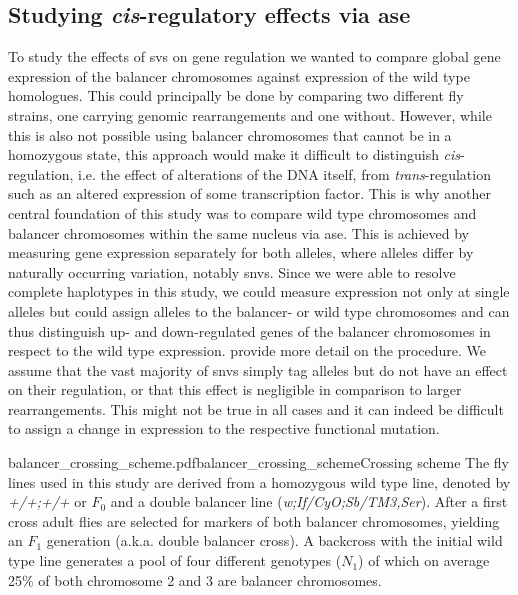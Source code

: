 \subsection{Studying \texorpdfstring{\textit{cis}}{cis}-regulatory effects via
    \texorpdfstring{\acl{ase}}{allele-specific expression}}
\label{sec:balancer_ase_motivation}

To study the effects of \acp{sv} on gene regulation we wanted to compare global
gene expression of the balancer chromosomes against expression of the wild type
homologues. This could principally be done by comparing two different fly
strains, one carrying genomic rearrangements and one without. However, while
this is also not possible using balancer chromosomes that cannot be
in a homozygous state, this approach would make it difficult to distinguish
\textit{cis}-regulation, i.e. the effect of alterations of the DNA itself, from
\textit{trans}-regulation such as an altered expression of some transcription
factor. This is why another central foundation of this study was to compare wild
type chromosomes and balancer chromosomes within the same nucleus via \acf{ase}.
This is achieved by measuring gene expression separately for both alleles, where
alleles differ by naturally occurring variation, notably \acp{snv}.
Since we were able to resolve complete haplotypes in this study, we could
measure expression not only at single alleles but could assign alleles to
the balancer- or wild type chromosomes and can thus distinguish up- and
down-regulated genes of the balancer chromosomes in respect to the wild type
expression.  provide
more detail on the procedure.
We assume that the vast majority of \acp{snv} simply tag alleles but do not have
an effect on their regulation, or that this effect is negligible in comparison
to larger rearrangements. This might not be true in all cases and it can indeed
be difficult to assign a change in expression to the respective functional
mutation.



    {balancer_crossing_scheme.pdf}{balancer_crossing_scheme}{Crossing scheme}{
        The fly lines used in this study are derived from a homozygous wild type
        line, denoted by \textit{+/+;+/+} or $F_0$ and a double balancer line
        (\textit{w;If/CyO;Sb/TM3,Ser}). After a first cross adult flies are
        selected for markers of both balancer chromosomes, yielding an $F_1$
        generation (a.k.a. double balancer cross). A backcross with the initial
        wild type line generates a pool of four different genotypes ($N_1$)
        of which on average 25\% of both chromosome 2 and 3 are balancer
        chromosomes.}



